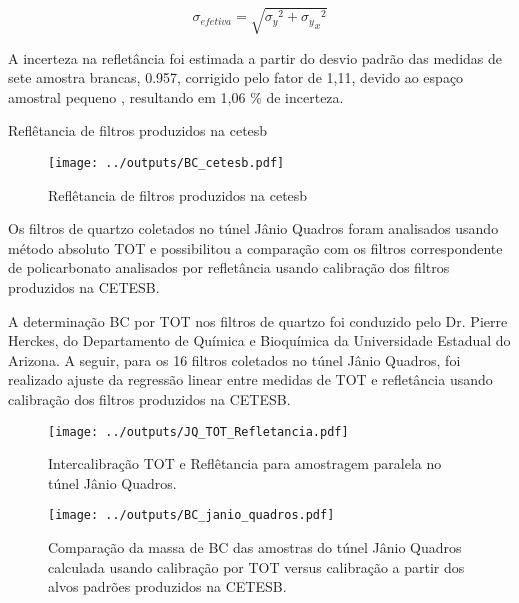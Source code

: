 \begin{equation}
  \sigma_{efetiva} = \sqrt{{\sigma_y}^2 + {{\sigma_y}_x}^2}
\end{equation} 

A incerteza na refletância foi estimada a partir do desvio padrão das medidas
de sete amostra brancas, 0.957, corrigido pelo fator de 1,11, devido ao espaço
amostral pequeno \citep{helene1981}, resultando em 1,06 \% de incerteza. 


\newpage
\begin{table}[H]
  \centering
  \small
    
    \caption{Reflêtancia de filtros produzidos na cetesb}
\end{table} 

\begin{figure}[H]
  \centering
  \texttt{[image: ../outputs/BC\_cetesb.pdf]}
  \caption{Reflêtancia de filtros produzidos na cetesb}
\end{figure}
\newpage

Os filtros de quartzo coletados no túnel Jânio Quadros foram analisados usando
método absoluto TOT e possibilitou a comparação com os filtros correspondente 
de policarbonato analisados por refletância usando calibração dos filtros
produzidos na CETESB. 

A determinação BC por TOT nos filtros de quartzo foi conduzido pelo 
Dr. Pierre Herckes, do Departamento de Química e Bioquímica da 
Universidade Estadual do Arizona. A seguir, para os 16 filtros coletados no 
túnel Jânio Quadros, foi realizado ajuste da regressão linear
entre medidas de TOT e refletância usando calibração dos filtros produzidos na 
CETESB.

\begin{figure}
  \centering
  \texttt{[image: ../outputs/JQ\_TOT\_Refletancia.pdf]}
  \caption{Intercalibração TOT e Reflêtancia para amostragem paralela no 
           túnel Jânio Quadros.}
\end{figure}

\begin{figure}[H]
  \centering
  \begin{minipage}[b]{0.5\linewidth}
    \texttt{[image: ../outputs/BC\_janio\_quadros.pdf]}
    \caption{Comparação da massa de BC das amostras do túnel Jânio Quadros 
             calculada usando calibração por TOT versus calibração a partir dos 
             alvos padrões produzidos na CETESB.}
  \end{minipage}%
  \hspace{0.5cm}
  \begin{minipage}[b]{0.45\linewidth}
    \begin{small}
      
    \end{small}
  \end{minipage}
\end{figure}

